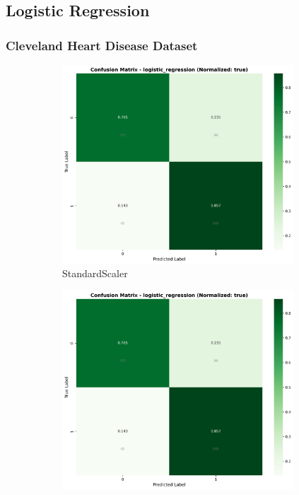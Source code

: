 \FloatBarrier

\subsection{Logistic Regression}\label{subsec:logreg}

\subsubsection{Cleveland Heart Disease Dataset}\label{subsubsec:logreg-cleveland}

\begin{figure}[H]\centering
\begin{subfigure}[b]{0.31\textwidth}\centering
\includegraphics[width=0.95\textwidth]{Result/cleveland_dataset/confusion_matrices/logistic_regression_numeric_dataset_StandardScaler.png}
\caption{StandardScaler}\label{fig:logreg_clev_cm_standard}
\end{subfigure}\hfill
\begin{subfigure}[b]{0.31\textwidth}\centering
\includegraphics[width=0.95\textwidth]{Result/cleveland_dataset/confusion_matrices/logistic_regression_numeric_dataset_MinMaxScaler.png}

\end{subfigure}
\end{figure}
